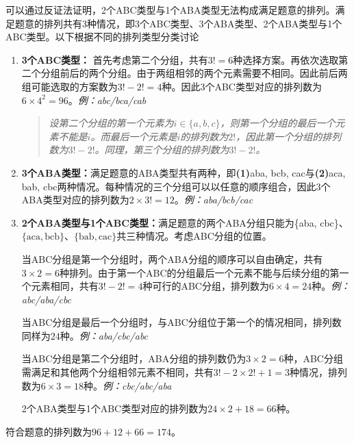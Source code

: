 \documentclass{../notes}
\begin{document}
\begin{subquestions}
        可以通过反证法证明，2个ABC类型与1个ABA类型无法构成满足题意的排列。满足题意的排列共有3种情况，即3个ABC类型、3个ABA类型、2个ABA类型与1个ABC类型。以下根据不同的排列类型分类讨论

        \begin{enumerate}
            \item \textbf{3个ABC类型：} 首先考虑第二个分组，共有$3!=6$种选择方案。再依次选取第二个分组前后的两个分组。由于两组相邻的两个元素需要不相同。因此前后两组可能选取的方案数为$3!-2! = 4$种。因此3个ABC类型对应的排列数为$6\times 4^2 = 96$。\textit{例：abc/bca/cab}

            \begin{quote}
                \textit{
                    设第二个分组的第一个元素为$i\in \{a,b,c\}$，则第一个分组的最后一个元素不能是$i$。而最后一个元素是$i$的排列数为$2!$，因此第一个分组的排列数为$3!-2!$。同理，第三个分组的排列数为$3!-2!$。
                }
            \end{quote}

            \item \textbf{3个ABA类型：}满足题意的ABA类型共有两种，即\textbf{(1)}aba, bcb, cac与\textbf{(2)}aca, bab, cbc两种情况。每种情况的三个分组可以以任意的顺序组合，因此3个ABA类型对应的排列数为$2\times 3! = 12$。\textit{例：aba/bcb/cac}

            \item \textbf{2个ABA类型与1个ABC类型：}满足题意的两个ABA分组只能为\{aba, cbc\}、$\{\mathrm{aca, bcb}\}$、$\{\mathrm {bab, cac}\}$共三种情况。考虑ABC分组的位置。

            当ABC分组是第一个分组时，两个ABA分组的顺序可以自由确定，共有$3\times 2 = 6$种排列。由于第一个ABC的分组最后一个元素不能与后续分组的第一个元素相同，共有$3!-2!=4$种可行的ABC分组，排列数为$6\times 4 = 24$种。\textit{例：abc/aba/cbc}

            当ABC分组是最后一个分组时，与ABC分组位于第一个的情况相同，排列数同样为$24$种。\textit{例：aba/cbc/abc}

            当ABC分组是第二个分组时，ABA分组的排列数仍为$3\times 2 = 6$种，ABC分组需满足和其他两个分组相邻元素不相同，共有$3!-2\times 2!+1=3$种情况，排列数为$6\times 3=18$种。\textit{例：cbc/abc/aba}

            2个ABA类型与1个ABC类型对应的排列数为$24\times 2 + 18 = 66$种。
        \end{enumerate}

        符合题意的排列数为$96 + 12 + 66 = 174$。
    \end{subquestions}
\end{document}
